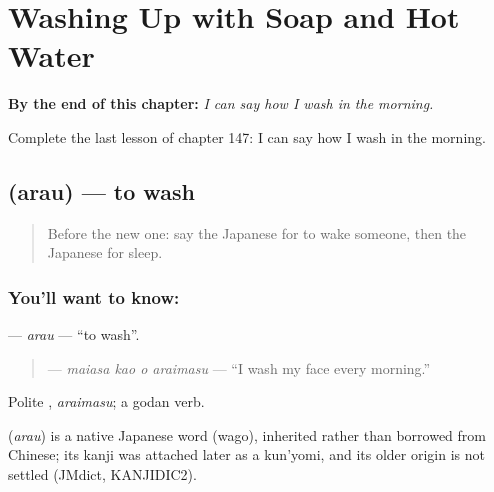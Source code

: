 
\chapter{Washing Up with Soap and Hot Water}
\label{ch:ja-washing-up-with-soap-and-hot-water}

\begin{chapteropening}
\textbf{By the end of this chapter:} \emph{I can say how I wash in the morning.}

Complete the last lesson of chapter 147: I can say how I wash in the morning.
\end{chapteropening}

\section[\texorpdfstring{\ja{あらう} (arau)}{あらう (arau)}]{ (arau) — to wash}

\label{lesson:JA-C147-arau}



\begin{quote}
Before the new one: say the Japanese for to wake someone, then the Japanese for sleep.
\end{quote}

\subsection*{You'll want to know: }
\textbf{} — \emph{arau} — \textquotedblleft{}to wash\textquotedblright{}.

\begin{quote}
\textbf{  } — \emph{maiasa kao o araimasu} — \textquotedblleft{}I wash my face every morning.\textquotedblright{}
\end{quote}

Polite \textbf{}, \emph{araimasu}; a godan verb.

\begin{cousinweb}
\textbf{} (\emph{arau}) is a native Japanese word (wago), inherited rather than borrowed from Chinese; its kanji was attached later as a kun'yomi, and its older origin is not settled (JMdict, KANJIDIC2).
\end{cousinweb}


